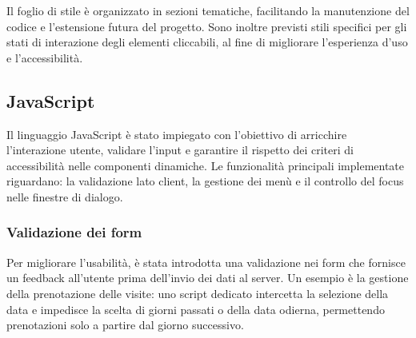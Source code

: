 \documentclass[10pt, letterpaper]{article}
\begin{document}
Il foglio di stile è organizzato in sezioni tematiche, facilitando la manutenzione del codice e l’estensione futura del progetto.
Sono inoltre previsti stili specifici per gli stati di interazione degli elementi cliccabili, al fine di migliorare l’esperienza d’uso e l’accessibilità.

\subsection{JavaScript}
Il linguaggio JavaScript è stato impiegato con l'obiettivo di arricchire l'interazione utente, validare l'input e garantire il rispetto dei criteri di accessibilità nelle componenti dinamiche.
Le funzionalità principali implementate riguardano: la validazione lato client, la gestione dei menù e il controllo del focus nelle finestre di dialogo.

\subsubsection{Validazione dei form}
Per migliorare l'usabilità, è stata introdotta una validazione nei form che fornisce un feedback all'utente prima dell'invio dei dati al server.
Un esempio è la gestione della prenotazione delle visite: uno script dedicato intercetta la selezione della data e impedisce la scelta di giorni passati o della data odierna, permettendo prenotazioni solo a partire dal giorno successivo.
\end{document}
